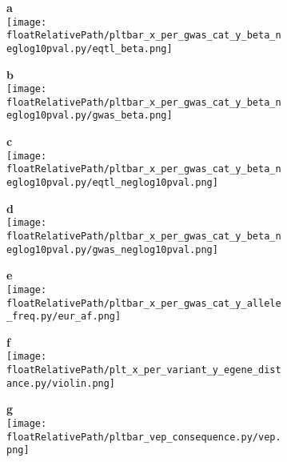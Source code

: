 \begin{figure}[!ht]

    \begin{subfigure}[]{.49\textwidth}
        \textbf{a}
        \\
        \texttt{[image: \\floatRelativePath/pltbar\_x\_per\_gwas\_cat\_y\_beta\_neglog10pval.py/eqtl\_beta.png]}
    \end{subfigure}
    \begin{subfigure}[]{.49\textwidth}
        \textbf{b}
        \\
        \texttt{[image: \\floatRelativePath/pltbar\_x\_per\_gwas\_cat\_y\_beta\_neglog10pval.py/gwas\_beta.png]}
    \end{subfigure}

    \begin{subfigure}[]{.49\textwidth}
        \textbf{c}
        \\
        \texttt{[image: \\floatRelativePath/pltbar\_x\_per\_gwas\_cat\_y\_beta\_neglog10pval.py/eqtl\_neglog10pval.png]}
    \end{subfigure}
    \begin{subfigure}[]{.49\textwidth}
        \textbf{d}
        \\
        \texttt{[image: \\floatRelativePath/pltbar\_x\_per\_gwas\_cat\_y\_beta\_neglog10pval.py/gwas\_neglog10pval.png]}
    \end{subfigure}

    \centering
    \begin{subfigure}[]{.49\textwidth}
        \textbf{e}
        \\
        \texttt{[image: \\floatRelativePath/pltbar\_x\_per\_gwas\_cat\_y\_allele\_freq.py/eur\_af.png]}
    \end{subfigure}
    \begin{subfigure}[]{.49\textwidth}
        \textbf{f}
        \\
        \texttt{[image: \\floatRelativePath/plt\_x\_per\_variant\_y\_egene\_distance.py/violin.png]}
    \end{subfigure}

    \begin{subfigure}[]{.49\textwidth}
        \textbf{g}
        \\
        \texttt{[image: \\floatRelativePath/pltbar\_vep\_consequence.py/vep.png]}
    \end{subfigure}

    \caption{}

\end{figure}

